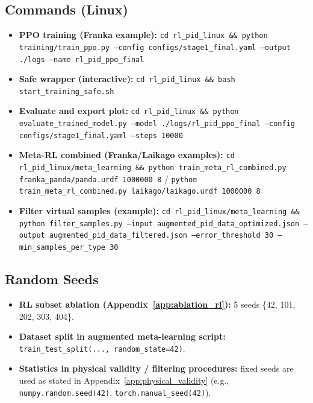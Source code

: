 \documentclass[a4paper]{cas-sc}
\begin{document}
\subsection{Commands (Linux)}
\begin{itemize}[leftmargin=*, itemsep=2pt]
    \item \textbf{PPO training (Franka example):} \texttt{cd rl\_pid\_linux \&\& python training/train\_ppo.py --config configs/stage1\_final.yaml --output ./logs --name rl\_pid\_ppo\_final}
    \item \textbf{Safe wrapper (interactive):} \texttt{cd rl\_pid\_linux \&\& bash start\_training\_safe.sh}
    \item \textbf{Evaluate and export plot:} \texttt{cd rl\_pid\_linux \&\& python evaluate\_trained\_model.py --model ./logs/rl\_pid\_ppo\_final --config configs/stage1\_final.yaml --steps 10000}
    \item \textbf{Meta-RL combined (Franka/Laikago examples):} \texttt{cd rl\_pid\_linux/meta\_learning \&\& python train\_meta\_rl\_combined.py franka\_panda/panda.urdf 1000000 8} \; / \; \texttt{python train\_meta\_rl\_combined.py laikago/laikago.urdf 1000000 8}
    \item \textbf{Filter virtual samples (example):} \texttt{cd rl\_pid\_linux/meta\_learning \&\& python filter\_samples.py --input augmented\_pid\_data\_optimized.json --output augmented\_pid\_data\_filtered.json --error\_threshold 30 --min\_samples\_per\_type 30}
\end{itemize}

\subsection{Random Seeds}
\begin{itemize}[leftmargin=*, itemsep=2pt]
    \item \textbf{RL subset ablation (Appendix~\ref{app:ablation_rl}):} 5 seeds \{42, 101, 202, 303, 404\}.
    \item \textbf{Dataset split in augmented meta-learning script:} \texttt{train\_test\_split(..., random\_state=42)}.
    \item \textbf{Statistics in physical validity / filtering procedures:} fixed seeds are used as stated in Appendix~\ref{app:physical_validity} (e.g., \texttt{numpy.random.seed(42)}, \texttt{torch.manual\_seed(42)}).
\end{itemize}
\end{document}
